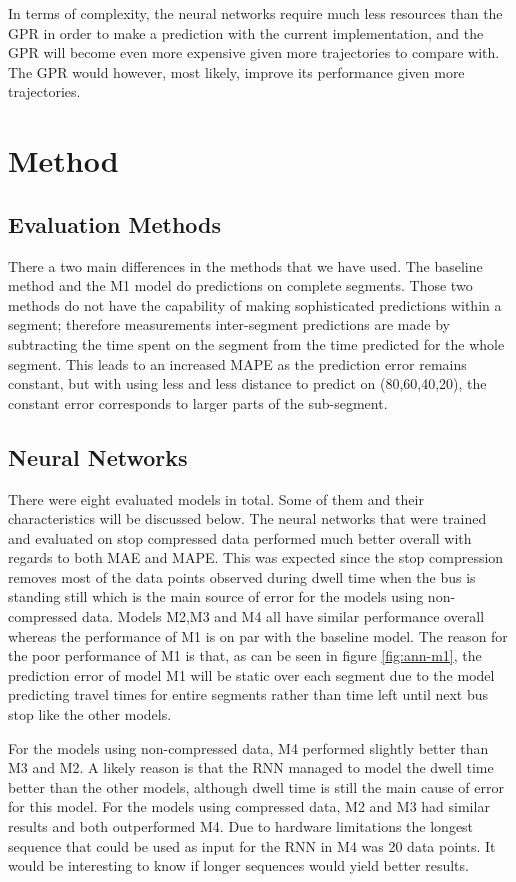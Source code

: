 In terms of complexity, the neural networks require much less resources than the GPR in order to make a prediction with the current implementation, and the GPR will become even more expensive given more trajectories to compare with. The GPR would however, most likely, improve its performance given more trajectories.

\section{Method}
\label{sec:discussion-method}
\subsection{Evaluation Methods}
There a two main differences in the methods that we have used. The baseline method and the M1 model do predictions on complete segments. Those two methods do not have the capability of making sophisticated predictions within a segment; therefore measurements inter-segment predictions are made by subtracting the time spent on the segment from the time predicted for the whole segment. This leads to an increased MAPE as the prediction error remains constant, but with using less and less distance to predict on (80,60,40,20), the constant error corresponds to larger parts of the sub-segment.

\subsection{Neural Networks}
There were eight evaluated models in total. Some of them and their characteristics will be discussed below. The neural networks that were trained and evaluated on stop compressed data performed much better overall with regards to both MAE and MAPE. This was expected since the stop compression removes most of the data points observed during dwell time when the bus is standing still which is the main source of error for the models using non-compressed data. Models M2,M3 and M4 all have similar performance overall whereas the performance of M1 is on par with the baseline model. The reason for the poor performance of M1 is that, as can be seen in figure \ref{fig:ann-m1}, the prediction error of model M1 will be static over each segment due to the model predicting travel times for entire segments rather than time left until next bus stop like the other models.

For the models using non-compressed data, M4 performed slightly better than M3 and M2. A likely reason is that the RNN managed to model the dwell time better than the other models, although dwell time is still the main cause of error for this model. For the models using compressed data, M2 and M3 had similar results and both outperformed M4. Due to hardware limitations the longest sequence that could be used as input for the RNN in M4 was 20 data points. It would be interesting to know if longer sequences would yield better results.


